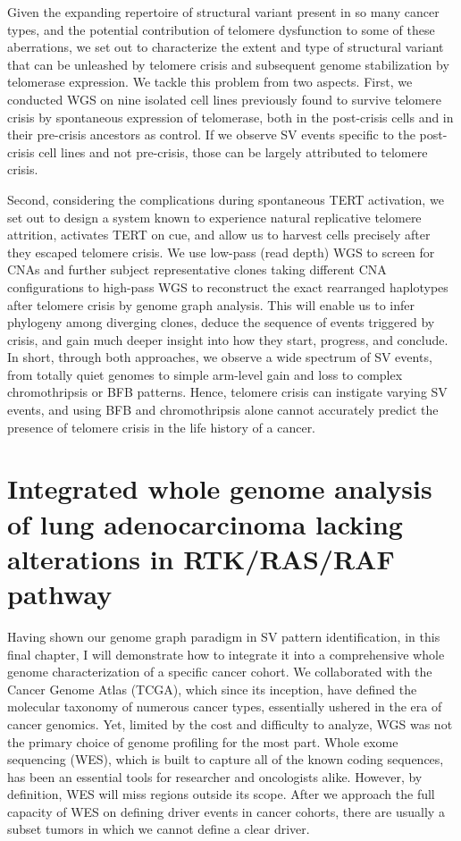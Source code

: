 \documentclass[phd,tocprelim]{cornell}
\begin{document}
Given the expanding repertoire of structural variant present in so many cancer types, and the potential contribution of telomere dysfunction to some of these aberrations, we set out to characterize the extent and type of structural variant that can be unleashed by telomere crisis and subsequent genome stabilization by telomerase expression. We tackle this problem from two aspects. First, we conducted WGS on nine isolated cell lines previously found to survive telomere crisis by spontaneous expression of telomerase, both in the post-crisis cells and in their pre-crisis ancestors as control. If we observe SV events specific to the post-crisis cell lines and not pre-crisis, those can be largely attributed to telomere crisis.

Second, considering the complications during spontaneous TERT activation, we set out to design a system known to experience natural replicative telomere attrition, activates TERT on cue, and allow us to harvest cells precisely after they escaped telomere crisis. We use low-pass (read depth) WGS to screen for CNAs and further subject representative clones taking different CNA configurations to high-pass WGS to reconstruct the exact rearranged haplotypes after telomere crisis by genome graph analysis. This will enable us to infer phylogeny among diverging clones, deduce the sequence of events triggered by crisis, and gain much deeper insight into how they start, progress, and conclude. In short, through both approaches, we observe a wide spectrum of SV events, from totally quiet genomes to simple arm-level gain and loss to complex chromothripsis or BFB patterns. Hence, telomere crisis can instigate varying SV events, and using BFB and chromothripsis alone cannot accurately predict the presence of telomere crisis in the life history of a cancer.

\section{Integrated whole genome analysis of lung adenocarcinoma lacking alterations in RTK/RAS/RAF pathway}
Having shown our genome graph paradigm in SV pattern identification, in this final chapter, I will demonstrate how to integrate it into a comprehensive whole genome characterization of a specific cancer cohort. We collaborated with the Cancer Genome Atlas (TCGA), which since its inception, have defined the molecular taxonomy of numerous cancer types, essentially ushered in the era of cancer genomics. Yet, limited by the cost and difficulty to analyze, WGS was not the primary choice of genome profiling for the most part. Whole exome sequencing (WES), which is built to capture all of the known coding sequences, has been an essential tools for researcher and oncologists alike. However, by definition, WES will miss regions outside its scope. After we approach the full capacity of WES on defining driver events in cancer cohorts, there are usually a subset tumors in which we cannot define a clear driver.
\end{document}
